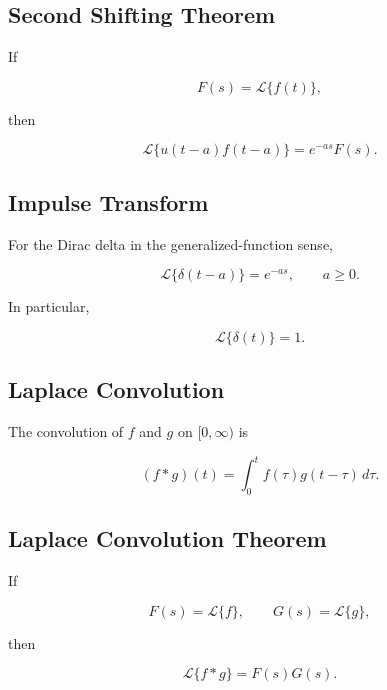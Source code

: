 \subsection{Second Shifting Theorem}
\label{subsec:laplace-second-shift}

If

\[
F(s)
=
\mathcal{L}\{f(t)\},
\]

then

\[
\boxed{
\mathcal{L}
\{
u(t-a)f(t-a)
\}
=
e^{-as}F(s).
}
\]

\subsection{Impulse Transform}
\label{subsec:dirac-delta-laplace-reference}

For the Dirac delta in the generalized-function sense,

\[
\boxed{
\mathcal{L}\{\delta(t-a)\}
=
e^{-as},
\qquad
a\geq0.
}
\]

In particular,

\[
\boxed{
\mathcal{L}\{\delta(t)\}
=
1.
}
\]

\subsection{Laplace Convolution}
\label{subsec:laplace-convolution-reference}

The convolution of \(f\) and \(g\) on \([0,\infty)\) is

\[
\boxed{
(f*g)(t)
=
\int_0^t
f(\tau)
g(t-\tau)
\,d\tau.
}
\]

\subsection{Laplace Convolution Theorem}
\label{subsec:laplace-convolution-theorem}

If

\[
F(s)=\mathcal{L}\{f\},
\qquad
G(s)=\mathcal{L}\{g\},
\]

then

\[
\boxed{
\mathcal{L}\{f*g\}
=
F(s)G(s).
}
\]

